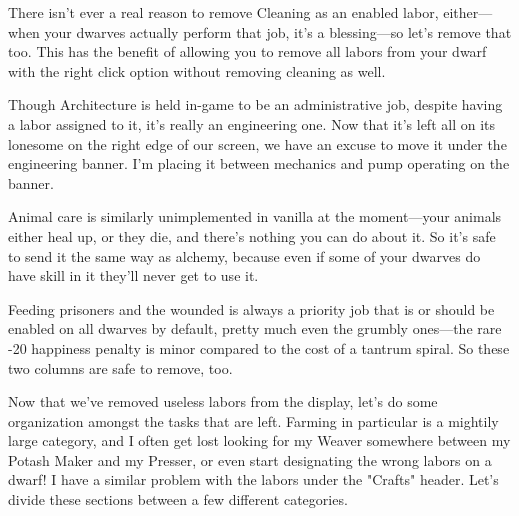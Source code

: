 \documentclass[]{article}
\begin{document}
There isn't ever a real reason to remove Cleaning as an enabled labor, either---when your dwarves
actually perform that job, it's a blessing---so let's remove that too. This has the benefit of allowing
you to remove all labors from your dwarf with the right click option without removing cleaning as well.
\vspace{12pt}

Though Architecture is held in-game to be an administrative job, despite having a labor assigned to it,
it's really an engineering one. Now that it's left all on its lonesome on the right edge of our screen,
we have an excuse to move it under the engineering banner. I'm placing it between mechanics and pump
operating on the banner.
\vspace{12pt}

Animal care is similarly unimplemented in vanilla at the moment---your animals either heal up, or they
die, and there's nothing you can do about it. So it's safe to send it the same way as alchemy, because
even if some of your dwarves do have skill in it they'll never get to use it.
\vspace{12pt}

Feeding prisoners and the wounded is always a priority job that is or should be enabled on all dwarves by
default, pretty much even the grumbly ones---the rare -20 happiness penalty is minor compared to the cost
of a tantrum spiral. So these two columns are safe to remove, too.
\vspace{12pt}

Now that we've removed useless labors from the display, let's do some organization amongst the tasks that
are left. Farming in particular is a mightily large category, and I often get lost looking for my Weaver
somewhere between my Potash Maker and my Presser, or even start designating the wrong labors on a dwarf!
I have a similar problem with the labors under the "Crafts" header. Let's divide these sections between a
few different categories.
\vspace{12pt}
\end{document}
